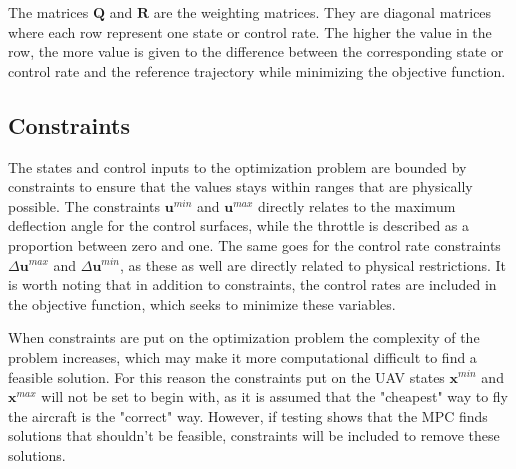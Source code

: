 The matrices $\mathbf{Q}$ and $\mathbf{R}$ are the weighting matrices. They are diagonal matrices where each row represent one state or control rate. The higher the value in the row, the more value is given to the difference between the corresponding state or control rate and the reference trajectory while minimizing the objective function.


\subsection{Constraints}

The states and control inputs to the optimization problem are bounded by constraints to ensure that the values stays within ranges that are physically possible. The constraints $\mathbf{u}^{min}$ and $\mathbf{u}^{max}$ directly relates to the maximum deflection angle for the control surfaces, while the throttle is described as a proportion between zero and one. The same goes for the control rate constraints $\Delta \mathbf{u}^{max}$ and $\Delta \mathbf{u}^{min}$, as these as well are directly related to physical restrictions. It is worth noting that in addition to constraints, the control rates are included in the objective function, which seeks to minimize these variables.

When constraints are put on the optimization problem the complexity of the problem increases, which may make it more computational difficult to find a feasible solution. For this reason the constraints put on the UAV states $\mathbf{x}^{min}$ and $\mathbf{x}^{max}$ will not be set to begin with, as it is assumed that the "cheapest" way to fly the aircraft is the "correct" way. However, if testing shows that the MPC finds solutions that shouldn't be feasible, constraints will be included to remove these solutions.